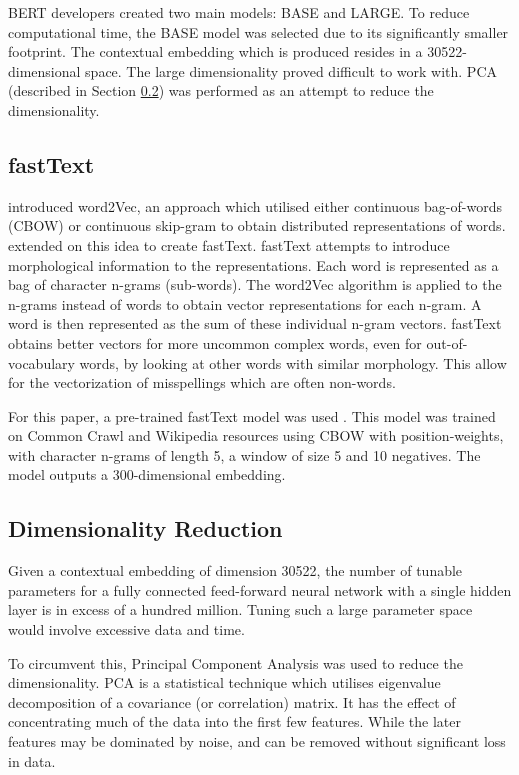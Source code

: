 \documentclass[11pt,a4paper]{article}
\begin{document}
BERT developers created two main models: BASE and LARGE. To reduce computational time, the BASE model was selected due to its significantly smaller footprint. The contextual embedding which is produced resides in a 30522-dimensional space. The large dimensionality proved difficult to work with. PCA (described in Section \ref{dimred}) was performed as an attempt to reduce the dimensionality. 

\subsection{fastText}
\label{fastText}
\citet{word2vec} introduced word2Vec, an approach which utilised either continuous bag-of-words (CBOW) or continuous skip-gram to obtain distributed representations of words. \citet{fastText} extended on this idea to create fastText. fastText attempts to introduce morphological information to the representations. Each word is represented as a bag of character n-grams (sub-words). The word2Vec algorithm is applied to the n-grams instead of words to obtain vector representations for each n-gram. A word is then represented as the sum of these individual n-gram vectors. fastText obtains better vectors for more uncommon complex words, even for out-of-vocabulary words, by looking at other words with similar morphology. This allow for the vectorization of misspellings which are often non-words.

For this paper, a pre-trained fastText model was used \cite{pretrainFTmodels}. This model was trained on Common Crawl and Wikipedia resources using CBOW with position-weights, with character n-grams of length 5, a window of size 5 and 10 negatives. The model outputs a 300-dimensional embedding. 

\subsection{Dimensionality Reduction}
\label{dimred}
Given a contextual embedding of dimension 30522, the number of tunable parameters for a fully connected feed-forward neural network with a single hidden layer is in excess of a hundred million. Tuning such a large parameter space would involve excessive data and time. 

To circumvent this, Principal Component Analysis was used to reduce the dimensionality. PCA is a statistical technique which utilises eigenvalue decomposition of a covariance (or correlation) matrix. It has the effect of concentrating much of the data into the first few features. While the later features may be dominated by noise, and can be removed without significant loss in data. 
\end{document}
